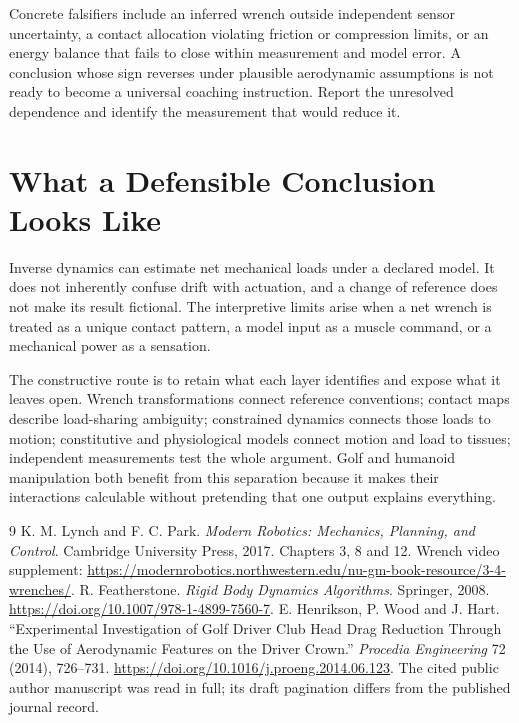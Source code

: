 \documentclass[11pt,a4paper]{article}
\begin{document}
Concrete falsifiers include an inferred wrench outside independent sensor uncertainty, a contact allocation violating friction or compression limits, or an energy balance that fails to close within measurement and model error. A conclusion whose sign reverses under plausible aerodynamic assumptions is not ready to become a universal coaching instruction. Report the unresolved dependence and identify the measurement that would reduce it.

\section{What a Defensible Conclusion Looks Like}
Inverse dynamics can estimate net mechanical loads under a declared model. It does not inherently confuse drift with actuation, and a change of reference does not make its result fictional. The interpretive limits arise when a net wrench is treated as a unique contact pattern, a model input as a muscle command, or a mechanical power as a sensation.

The constructive route is to retain what each layer identifies and expose what it leaves open. Wrench transformations connect reference conventions; contact maps describe load-sharing ambiguity; constrained dynamics connects those loads to motion; constitutive and physiological models connect motion and load to tissues; independent measurements test the whole argument. Golf and humanoid manipulation both benefit from this separation because it makes their interactions calculable without pretending that one output explains everything.

\begin{thebibliography}{9}
 K. M. Lynch and F. C. Park. \emph{Modern Robotics: Mechanics, Planning, and Control}. Cambridge University Press, 2017. Chapters 3, 8 and 12. Wrench video supplement: \url{https://modernrobotics.northwestern.edu/nu-gm-book-resource/3-4-wrenches/}.
 R. Featherstone. \emph{Rigid Body Dynamics Algorithms}. Springer, 2008. \url{https://doi.org/10.1007/978-1-4899-7560-7}.
 E. Henrikson, P. Wood and J. Hart. ``Experimental Investigation of Golf Driver Club Head Drag Reduction Through the Use of Aerodynamic Features on the Driver Crown.'' \emph{Procedia Engineering} 72 (2014), 726--731. \url{https://doi.org/10.1016/j.proeng.2014.06.123}. The cited public author manuscript was read in full; its draft pagination differs from the published journal record.
\end{thebibliography}
\end{document}
